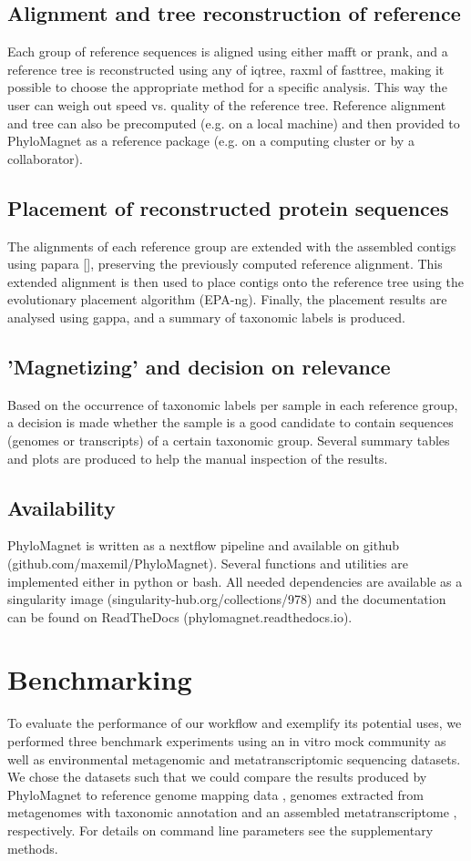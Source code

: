 \documentclass{bioinfo}
\newcommand{\epa}{EPA-ng}
\begin{document}
\begin{methods}
\subsection{Alignment and tree reconstruction of reference}
Each group of reference sequences is aligned using either mafft or prank, and a reference tree is reconstructed using any of iqtree, raxml of fasttree, making it possible to choose the appropriate method for a specific analysis. This way the user can weigh out speed vs. quality of the reference tree. Reference alignment and tree can also be precomputed (e.g. on a local machine) and then provided to PhyloMagnet as a reference package (e.g. on a computing cluster or by a collaborator). 
\subsection{Placement of reconstructed protein sequences}
The alignments of each reference group are extended with the assembled contigs using papara [], preserving the previously computed reference alignment. This extended alignment is then used to place contigs onto the reference tree using the evolutionary placement algorithm (\epa). Finally, the placement results are analysed using gappa, and a summary of taxonomic labels is produced.
\subsection{'Magnetizing' and decision on relevance}
Based on the occurrence of taxonomic labels per sample in each reference group, a decision is made whether the sample is a good candidate to contain sequences (genomes or transcripts) of a certain taxonomic group. Several summary tables and plots are produced to help the manual inspection of the results. 
\subsection{Availability}
PhyloMagnet is written as a nextflow pipeline and available on github (github.com/maxemil/PhyloMagnet). Several functions and utilities are implemented either in python or bash. All needed dependencies are available as a singularity image (singularity-hub.org/collections/978) and the documentation can be found on ReadTheDocs (phylomagnet.readthedocs.io).
\section{Benchmarking}
To evaluate the performance of our workflow and exemplify its potential uses, we performed three benchmark experiments using an in vitro mock community as well as environmental metagenomic and metatranscriptomic sequencing datasets. We chose the datasets such that we could compare the results produced by PhyloMagnet to reference genome mapping data \citep{Singer2016}, genomes extracted from metagenomes with taxonomic annotation \citep{Delmont2018} and an assembled metatranscriptome \citep{Frazier2017}, respectively. For details on command line parameters see the supplementary methods.


\end{methods}
\end{document}
